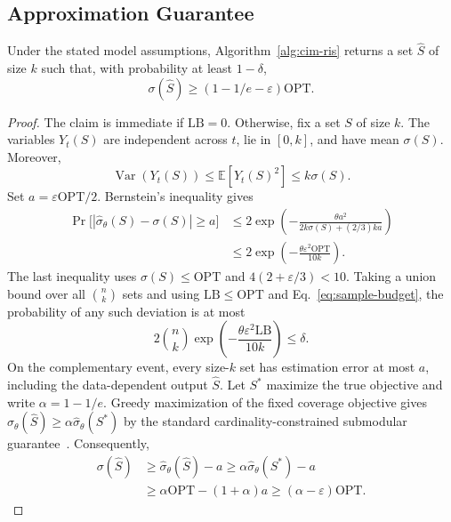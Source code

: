 \subsection{Approximation Guarantee}
\label{sec:theoretical-guarantees}

\begin{theorem}
\label{thm:approx}
Under the stated model assumptions, Algorithm~\ref{alg:cim-ris}
returns a set $\hat S$ of size $k$ such that, with probability
at least $1-\delta$,
\begin{equation}
\label{eq:approx-bound}
 \sigma(\hat S)\ge(1-1/e-\varepsilon)\mathrm{OPT}.
\end{equation}
\end{theorem}
\begin{proof}
The claim is immediate if $\mathrm{LB}=0$. Otherwise, fix a set
$S$ of size $k$. The variables $Y_t(S)$ are independent across
$t$, lie in $[0,k]$, and have mean $\sigma(S)$. Moreover,
\[
 \operatorname{Var}(Y_t(S))\le\mathbb E[Y_t(S)^2]
 \le k\sigma(S).
\]
Set $a=\varepsilon\mathrm{OPT}/2$. Bernstein's inequality gives
\begin{align}
\label{eq:bernstein}
 \Pr\bigl[|\hat\sigma_\theta(S)-\sigma(S)|\ge a\bigr]
 &\le 2\exp\left(-\frac{\theta a^2}
 {2k\sigma(S)+(2/3)ka}\right)\nonumber\\
 &\le 2\exp\left(-\frac{\theta\varepsilon^2\mathrm{OPT}}
 {10k}\right).
\end{align}
The last inequality uses $\sigma(S)\le\mathrm{OPT}$ and
$4(2+\varepsilon/3)<10$. Taking a union bound over all
$\binom nk$ sets and using $\mathrm{LB}\le\mathrm{OPT}$ and
Eq.~\eqref{eq:sample-budget}, the probability of any such
deviation is at most
\[
 2\binom nk\exp\left(-\frac{\theta\varepsilon^2\mathrm{LB}}
 {10k}\right)\le\delta.
\]
On the complementary event, every size-$k$ set has estimation
error at most $a$, including the data-dependent output $\hat S$.
Let $S^*$ maximize the true objective and write $\alpha=1-1/e$.
Greedy maximization of the fixed coverage objective gives
$\hat\sigma_\theta(\hat S)\ge\alpha\hat\sigma_\theta(S^*)$
by the standard cardinality-constrained submodular guarantee~\cite{nemhauser1978analysis}.
Consequently,
\begin{align*}
 \sigma(\hat S)
 &\ge\hat\sigma_\theta(\hat S)-a
 \ge\alpha\hat\sigma_\theta(S^*)-a\\
 &\ge\alpha\mathrm{OPT}-(1+\alpha)a
 \ge(\alpha-\varepsilon)\mathrm{OPT}.
\end{align*}
\end{proof}

